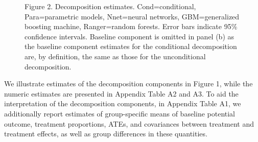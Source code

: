 \documentclass[12pt,a4paper]{article}
\begin{document}
\begin{figure}
\centering


\caption*{Figure 2. Decomposition estimates. Cond=conditional, Para=parametric models, Nnet=neural networks, GBM=generalized boosting machine, Ranger=random forests. Error bars indicate 95\% confidence intervals. Baseline component is omitted in panel (b) as the baseline component estimates for the conditional decomposition are, by definition, the same as those for the unconditional decomposition.} \label{fig:Result}
\end{figure}

We illustrate estimates of the decomposition components in Figure 1, while the numeric estimates are presented in Appendix Table A2 and A3. To aid the interpretation of the decomposition components, in Appendix Table A1, we additionally report estimates of group-specific means of baseline potential outcome, treatment proportions, ATEs, and covariances between treatment and treatment effects, as well as group differences in these quantities. 
\end{document}
